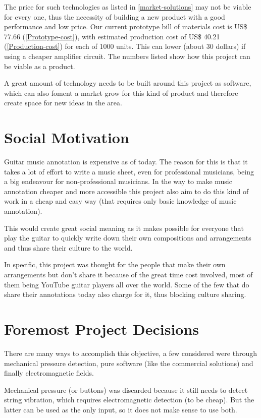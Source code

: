 The price for such technologies as listed in \autoref{market-solutions} may not be viable for every one,
thus the necessity of building a new product with a good performance and low price.
Our current prototype bill of materials cost is US\$ 77.66 (\autoref{Prototype-cost}), with estimated
production cost of US\$ 40.21 (\autoref{Production-cost}) for each of 1000 units. This can lower (about 30 dollars) if using
a cheaper amplifier circuit. The numbers listed show how this project can be viable
as a product. 

A great amount of technology needs to be built around this project as software, which
can also foment a market grow for this kind of product and therefore create space for
new ideas in the area.

\section{Social Motivation}
Guitar music annotation is expensive as of today. The reason for this is that
it takes a lot of effort to write a music sheet, even for professional musicians,
being a big endeavour for non-professional musicians. In the way to make music annotation
cheaper and more accessible this project also aim to do this kind of work in a cheap
and easy way (that requires only basic knowledge of music annotation). 

This would create great social meaning as it makes possible for everyone that play
the guitar to quickly write down their own compositions and arrangements and thus
share their culture to the world. 

In specific, this project was thought for the people that make their own arrangements
but don't share it because of the great time cost involved, most of them being YouTube
guitar players all over the world. Some of the few that do share their annotations today
also charge for it, thus blocking culture sharing. 

\section{Foremost Project Decisions}
There are many ways to accomplish this objective, a few considered were through
mechanical pressure detection, pure software (like the commercial solutions) and
finally electromagnetic fields. 

Mechanical pressure (or buttons) was discarded because it still needs to detect
string vibration, which requires electromagnetic detection (to be cheap). But the latter can
be used as the only input, so it does not make sense to use both. 

